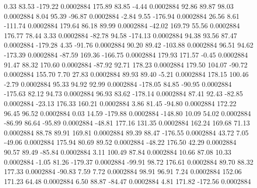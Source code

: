         0.33       83.53     -179.22     0.0002884
      175.89       83.85       -4.44     0.0002884
       92.86       89.87       98.03     0.0002884
        8.04       95.39      -96.87     0.0002884
       -2.84        9.55     -176.94     0.0002884
       26.56        8.61     -111.74     0.0002884
      179.64       86.18       89.99     0.0002884
      -42.02      169.79       55.56     0.0002884
      176.77       78.44        3.33     0.0002884
      -82.78       94.58     -174.13     0.0002884
       94.38       93.56       87.47     0.0002884
     -179.28        4.35      -91.76     0.0002884
       90.20       89.42     -103.88     0.0002884
       96.51       94.62     -173.39     0.0002884
      -87.59      169.36     -166.75     0.0002884
      179.93      171.57       -0.45     0.0002884
       91.47       88.32      170.60     0.0002884
      -87.92       92.71      178.23     0.0002884
      179.50      104.07      -90.72     0.0002884
      155.70        7.70       27.83     0.0002884
       89.93       89.40       -5.21     0.0002884
      178.15      100.46       -2.79     0.0002884
       95.33       94.92       92.99     0.0002884
     -178.05       84.85      -90.95     0.0002884
     -175.63       82.12       94.73     0.0002884
       96.93       83.62     -178.14     0.0002884
       87.41       92.43      -82.85     0.0002884
      -23.13      176.33      160.21     0.0002884
        3.86       81.45      -94.80     0.0002884
      172.22       96.45       96.52     0.0002884
        0.03       14.59     -179.88     0.0002884
     -148.80       10.09       54.02     0.0002884
      -86.99       86.64      -95.89     0.0002884
      -48.81      177.16      131.35     0.0002884
      162.24      169.68       71.13     0.0002884
       88.78       89.91      169.81     0.0002884
       89.39       88.47     -176.55     0.0002884
       43.72        7.05      -49.06     0.0002884
      175.94       80.69       89.52     0.0002884
      -48.22      176.50       42.29     0.0002884
       90.57       89.49      -85.84     0.0002884
        3.11      100.49       87.84     0.0002884
       10.66       87.08       10.33     0.0002884
       -1.05       81.26     -179.37     0.0002884
      -99.91       98.72      176.61     0.0002884
       89.70       88.32      177.33     0.0002884
      -90.83        7.59        7.72     0.0002884
       98.91       96.91        7.24     0.0002884
      152.06      171.23       64.48     0.0002884
        6.50       88.87      -84.47     0.0002884
        4.81      171.82     -172.56     0.0002884
